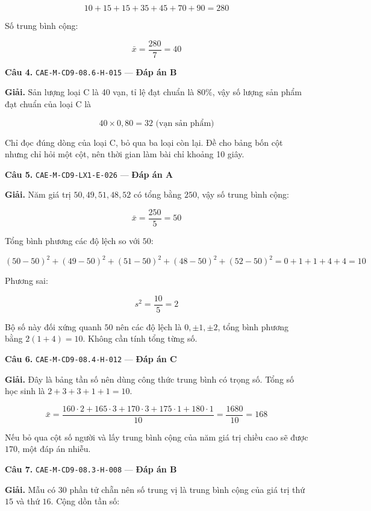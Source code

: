 \documentclass[11pt, a4paper]{article}
\begin{document}
$$10 + 15 + 15 + 35 + 45 + 70 + 90 = 280$$

Số trung bình cộng:

$$\bar{x} = \frac{280}{7} = 40$$

\textbf{Câu 4.} \texttt{CAE-M-CD9-08.6-H-015} — \textbf{Đáp án B}

\textbf{Giải.} Sản lượng loại C là 40 vạn, tỉ lệ đạt chuẩn là $80\%$, vậy số lượng sản phẩm đạt chuẩn của loại C là

$$40 \times 0{,}80 = 32 \text{ (vạn sản phẩm)}$$

 Chỉ đọc đúng dòng của loại C, bỏ qua ba loại còn lại. Đề cho bảng bốn cột nhưng chỉ hỏi một cột, nên thời gian làm bài chỉ khoảng 10 giây.

\textbf{Câu 5.} \texttt{CAE-M-CD9-LX1-E-026} — \textbf{Đáp án A}

\textbf{Giải.} Năm giá trị $50, 49, 51, 48, 52$ có tổng bằng $250$, vậy số trung bình cộng:

$$\bar{x} = \frac{250}{5} = 50$$

Tổng bình phương các độ lệch so với $50$:

$$(50-50)^2 + (49-50)^2 + (51-50)^2 + (48-50)^2 + (52-50)^2 = 0 + 1 + 1 + 4 + 4 = 10$$

Phương sai:

$$s^2 = \frac{10}{5} = 2$$

 Bộ số này đối xứng quanh $50$ nên các độ lệch là $0, \pm 1, \pm 2$, tổng bình phương bằng $2(1 + 4) = 10$. Không cần tính tổng từng số.

\textbf{Câu 6.} \texttt{CAE-M-CD9-08.4-H-012} — \textbf{Đáp án C}

\textbf{Giải.} Đây là bảng tần số nên dùng công thức trung bình có trọng số. Tổng số học sinh là $2 + 3 + 3 + 1 + 1 = 10$.

$$\bar{x} = \frac{160 \cdot 2 + 165 \cdot 3 + 170 \cdot 3 + 175 \cdot 1 + 180 \cdot 1}{10} = \frac{1680}{10} = 168$$

 Nếu bỏ qua cột số người và lấy trung bình cộng của năm giá trị chiều cao sẽ được $170$, một đáp án nhiễu.

\textbf{Câu 7.} \texttt{CAE-M-CD9-08.3-H-008} — \textbf{Đáp án B}

\textbf{Giải.} Mẫu có $30$ phần tử chẵn nên số trung vị là trung bình cộng của giá trị thứ $15$ và thứ $16$. Cộng dồn tần số:

\end{document}

